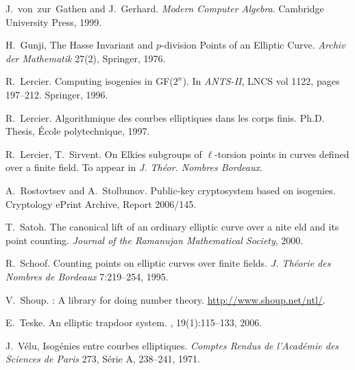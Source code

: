 \begin{thebibliography}{10}
  J.~von~zur~Gathen and J.~Gerhard. 
  \newblock \emph{Modern Computer Algebra}. 
  \newblock Cambridge University Press, 1999.

H.~Gunji,
  \newblock The Hasse Invariant and $p$-division Points of an Elliptic Curve.
  \newblock \emph{Archiv der Mathematik} 27(2), Springer, 1976.

  R.~Lercier.
  \newblock Computing isogenies in GF($2^n$).
  \newblock In {\em ANTS-II}, LNCS vol 1122, pages 197--212. Springer, 1996.

  R.~Lercier.
  \newblock Algorithmique des courbes elliptiques dans les corps finis. 
  \newblock Ph.D. Thesis, {\'E}cole polytechnique, 1997.

  R.~Lercier, T.~Sirvent.
  \newblock On Elkies subgroups of $\ell$-torsion points in curves defined over
  a finite field.
  \newblock To appear in {\em J. Th\'eor. Nombres Bordeaux}.

  A.~Rostovtsev and A.~Stolbunov.
  \newblock Public-key cryptosystem based on isogenies.
  \newblock Cryptology ePrint Archive, Report 2006/145.
  
  T.~Satoh.
  \newblock The canonical lift of an ordinary elliptic curve over a nite eld and its point counting.
  \newblock \emph{Journal of the Ramanujan Mathematical Society}, 2000.

  R.~Schoof.
  \newblock Counting points on elliptic curves over finite fields.
  \newblock \emph{J. Théorie des Nombres de Bordeaux} 7:219--254, 1995.

  V.~Shoup.
  : A library for doing number theory.
  \newblock \url{http://www.shoup.net/ntl/}.

  E.~Teske.
  \newblock An elliptic trapdoor system.
  , 19(1):115--133, 2006.

J.~Vélu,
  \newblock Isogénies entre courbes elliptiques.
  \newblock \emph{Comptes Rendus de l'Académie des Sciences de Paris} 273,
  Série A, 238--241, 1971.

  
  
\end{thebibliography}
